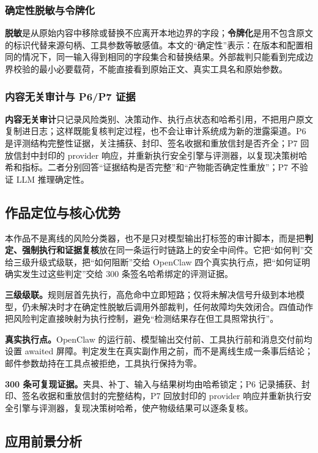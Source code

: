 \subsubsection{确定性脱敏与令牌化}

\textbf{脱敏}是从原始内容中移除或替换不应离开本地边界的字段；\textbf{令牌化}是用不包含原文的标识代替来源句柄、工具参数等敏感值。本文的“确定性”表示：在版本和配置相同的情况下，同一输入得到相同的字段集合和替换结果。外部裁判只能看到完成边界校验的最小必要载荷，不能直接看到原始正文、真实工具名和原始参数。

\subsubsection{内容无关审计与 P6/P7 证据}

\textbf{内容无关审计}只记录风险类别、决策动作、执行点状态和哈希引用，不把用户原文复制进日志；这样既能复核判定过程，也不会让审计系统成为新的泄露渠道。P6 是评测结构完整性证据，关注捕获、封印、签名收据和重放信封是否齐全；P7 回放信封中封印的 provider 响应，并重新执行安全引擎与评测器，以复现决策树哈希和指标。二者分别回答“证据结构是否完整”和“产物能否确定性重放”；P7 不验证 LLM 推理确定性。

\subsection{作品定位与核心优势}

本作品不是离线的风险分类器，也不是只对模型输出打标签的审计脚本，而是把\textbf{判定、强制执行和证据复核}放在同一条运行时链路上的安全中间件。它把“如何判”交给三级升级式级联，把“如何阻断”交给 OpenClaw 四个真实执行点，把“如何证明确实发生过这些判定”交给 300 条签名哈希绑定的评测证据。

\textbf{三级级联。}规则层首先执行，高危命中立即短路；仅将未解决信号升级到本地模型，仍未解决时才在确定性脱敏后调用外部裁判，任何故障均失效闭合。四值动作把风险判定直接映射为执行控制，避免“检测结果存在但工具照常执行”。

\textbf{真实执行点。}OpenClaw 的运行前、模型输出交付前、工具执行前和消息交付前均设置 awaited 屏障。判定发生在真实副作用之前，而不是离线生成一条事后结论；邮件参数劫持在工具点被拒绝，工具执行保持为零。

\textbf{300 条可复现证据。}夹具、补丁、输入与结果树均由哈希锁定；P6 记录捕获、封印、签名收据和重放信封的完整结构，P7 回放封印的 provider 响应并重新执行安全引擎与评测器，复现决策树哈希，使产物级结果可以逐条复核。

\subsection{应用前景分析}


